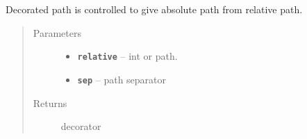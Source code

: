 \documentclass[letterpaper,10pt,english]{sphinxmanual}
\begin{document}

\begin{fulllineitems}
\label{RRtoolbox.lib:RRtoolbox.lib.directory.decoratePath}
Decorated path is controlled to give absolute path from relative path.
\begin{quote}\begin{description}
\item[{Parameters}] \leavevmode\begin{itemize}
\item {} 
\textbf{\texttt{relative}} -- int or path.

\item {} 
\textbf{\texttt{sep}} -- path separator

\end{itemize}

\item[{Returns}] \leavevmode
decorator

\end{description}\end{quote}

\end{fulllineitems}

\end{document}
